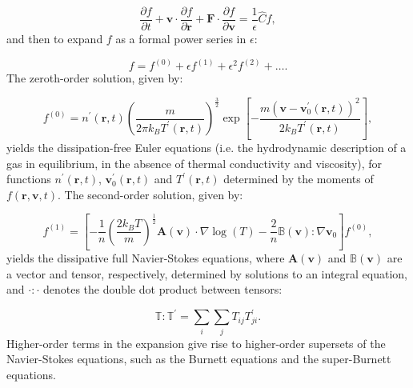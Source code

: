 \documentclass{article}
\begin{document}
\begin{equation}
\frac{\partial f}{\partial t} + \mathbf{v} \cdot \frac{\partial f}{\partial \mathbf{r}} + \mathbf{F} \cdot \frac{\partial f}{\partial \mathbf{v}} = \frac{1}{\epsilon} \hat{C} f,
\end{equation}
and then to expand $f$ as a formal power series in ${\epsilon}$:

\begin{equation}
f = f^{(0)} + \epsilon f^{(1)} + \epsilon^2 f^{(2)} + \dots.
\end{equation}
The zeroth-order solution, given by:

\begin{equation}
f^{(0)} = n^{\prime} \left( \mathbf{r}, t \right) \left( \frac{m}{2 \pi k_B T^{\prime} \left( \mathbf{r}, t \right)} \right)^{\frac{3}{2}} \exp \left[ - \frac{m \left( \mathbf{v} - \mathbf{v}_0^{\prime} \left( \mathbf{r}, t \right) \right)^2 }{2 k_B T^{\prime} \left( \mathbf{r}, t \right)} \right],
\end{equation}
yields the dissipation-free Euler equations (i.e. the hydrodynamic description of a gas in equilibrium, in the absence of thermal conductivity and viscosity), for functions ${n^{\prime} \left( \mathbf{r}, t \right)}$, ${\mathbf{v}_{0}^{\prime} \left( \mathbf{r}, t \right)}$ and ${T^{\prime} \left( \mathbf{r}, t \right)}$ determined by the moments of ${f \left( \mathbf{r}, \mathbf{v}, t \right)}$. The second-order solution, given by:

\begin{equation}
f^{(1)} = \left[ - \frac{1}{n} \left( \frac{2 k_B T}{m} \right)^{\frac{1}{2}} \mathbf{A} \left( \mathbf{v} \right) \cdot \nabla \log \left( T \right) - \frac{2}{n} \mathbb{B} \left( \mathbf{v} \right) : \nabla \mathbf{v}_0 \right] f^{(0)},
\end{equation}
yields the dissipative full Navier-Stokes equations, where ${\mathbf{A} \left( \mathbf{v} \right)}$ and ${\mathbb{B} \left( \mathbf{v} \right)}$ are a vector and tensor, respectively, determined by solutions to an integral equation, and ${\cdot : \cdot}$ denotes the double dot product between tensors:

\begin{equation}
\mathbb{T} : \mathbb{T^{\prime}} = \sum_i \sum_j T_{i j} T_{j i}^{\prime}.
\end{equation}
Higher-order terms in the expansion give rise to higher-order supersets of the Navier-Stokes equations, such as the Burnett equations and the super-Burnett equations.
\end{document}
